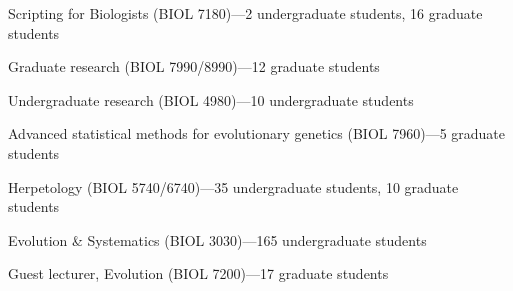 \begin{veryTightItemize}
    \item Scripting for Biologists (BIOL 7180)---2 undergraduate students, 16 graduate students
    \item Graduate research (BIOL 7990/8990)---12 graduate students
    \item Undergraduate research (BIOL 4980)---10 undergraduate students
    \item Advanced statistical methods for evolutionary genetics (BIOL 7960)---5 graduate students
    \item Herpetology (BIOL 5740/6740)---35 undergraduate students, 10 graduate students
    \item Evolution \& Systematics (BIOL 3030)---165 undergraduate students
    \item Guest lecturer, Evolution (BIOL 7200)---17 graduate students
\end{veryTightItemize}
